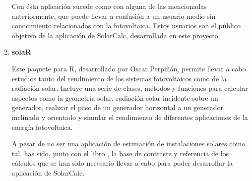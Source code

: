 \begin{enumerate}
Con ésta aplicación sucede como con alguna de las mencionadas anteriormente, que puede llevar a confusión a un usuario medio sin conocimiento relacionados con la fotovoltaica. Estos usuarios son el público objetivo de la aplicación de SolarCalc, desarrollada en este proyecto.

\item \textbf{solaR} \cite{sota_solaR}

Este paquete para R, desarrollado por Oscar Perpiñán, permite llevar a cabo estudios tanto del rendimiento de los sistemas fotovoltaicos como de la radiación solar. Incluye una serie de clases, métodos y funciones para calcular aspectos como la geometría solar, radiación solar incidente sobre un generador, realizar el paso de un generador horizontal a un generador inclinado y orientado y simular el rendimiento de diferentes aplicaciones de la energía fotovoltaica.

A pesar de no ser una aplicación de estimación de instalaciones solares como tal, has sido, junto con el libro \cite{esf_book}, la base de contraste y referencia de los cálculos que se han sido necesario llevar a cabo para poder desarrollar la aplicación de SolarCalc.

\end{enumerate}

